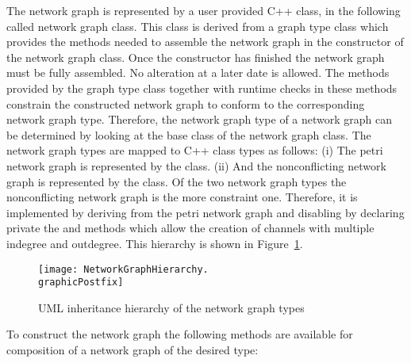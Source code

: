 The network graph is represented by a user provided C++ class, in the following called
network graph class. This class is derived from a \SysteMoC{} graph type class which
provides the methods needed to assemble the network graph in the constructor
of the network graph class. Once the constructor has finished the network graph must
be fully assembled. No alteration at a later date is allowed.
The methods provided by the \SysteMoC{} graph type class together with runtime checks
in these methods constrain the constructed network graph to conform to the corresponding
network graph type.
Therefore, the network graph type of a network graph can be determined by looking
at the base class of the network graph class.
The network graph types are mapped to C++ class types as follows:
(i) The petri network graph is represented by the  class.
(ii) And the nonconflicting network graph is represented by the  class.
Of the two network graph types the nonconflicting network graph is the more constraint
one. Therefore, it is implemented by deriving from the petri network graph
and disabling by declaring private the  and 
methods which allow the creation of channels with multiple indegree and outdegree.
This hierarchy is shown in Figure~\ref{network-graph-hierarchy}.

\begin{figure}[h]
\centering
\texttt{[image: NetworkGraphHierarchy.\\graphicPostfix]}\\
\caption{\label{network-graph-hierarchy}UML inheritance hierarchy of the network graph types}
\end{figure}

To construct the network graph the following methods are available for
composition of a network graph of the desired type:

